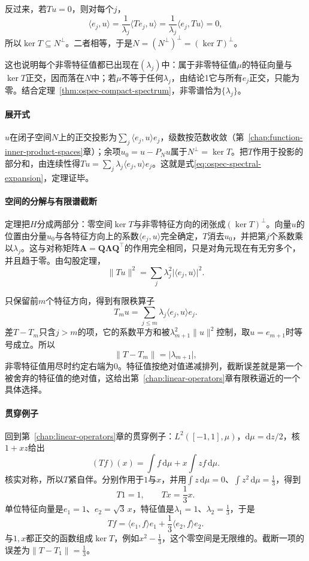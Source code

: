 反过来，若$Tu=0$，则对每个$j$，
\[
\langle e_j,u\rangle=\frac{1}{\lambda_j}\langle Te_j,u\rangle=\frac{1}{\lambda_j}\langle e_j,Tu\rangle=0 ,
\]
所以$\ker T\subseteq N^\perp$。二者相等，于是$N=(N^\perp)^\perp=(\ker T)^\perp$。

这也说明每个非零特征值都已出现在$(\lambda_j)$中：属于非零特征值$\mu$的特征向量与$\ker T$正交，因而落在$N$中；若$\mu$不等于任何$\lambda_j$，由结论1它与所有$e_j$正交，只能为零。结合定理~\ref{thm:ospec-compact-spectrum}，非零谱恰为$\{\lambda_j\}$。

\paragraph{展开式}
$u$在闭子空间$N$上的正交投影为$\sum_j\langle e_j,u\rangle e_j$，级数按范数收敛（第~\ref{chap:function-inner-product-spaces}章）；余项$u_0=u-P_Nu$属于$N^\perp=\ker T$。把$T$作用于投影的部分和，由连续性得$Tu=\sum_j\lambda_j\langle e_j,u\rangle e_j$。这就是式\eqref{eq:ospec-spectral-expansion}，定理证毕。

\paragraph{空间的分解与有限谱截断}
定理把$H$分成两部分：零空间$\ker T$与非零特征方向的闭张成$(\ker T)^\perp$。向量$u$的位置由分量$u_0$与各特征方向上的系数$\langle e_j,u\rangle$完全确定，$T$消去$u_0$，并把第$j$个系数乘以$\lambda_j$。这与对称矩阵$\bm A=\bm Q\bm\Lambda\bm Q^\top$的作用完全相同，只是对角元现在有无穷多个，并且趋于零。由勾股定理，
\begin{equation}
\lVert Tu\rVert^2=\sum_j\lambda_j^2\lvert\langle e_j,u\rangle\rvert^2 .
\label{eq:ospec-spectral-norm}
\end{equation}

只保留前$m$个特征方向，得到有限秩算子
\[
T_mu=\sum_{j\leq m}\lambda_j\langle e_j,u\rangle e_j .
\]
差$T-T_m$只含$j>m$的项，它的系数平方和被$\lambda_{m+1}^2\lVert u\rVert^2$控制，取$u=e_{m+1}$时等号成立。所以
\begin{equation}
\lVert T-T_m\rVert=\lvert\lambda_{m+1}\rvert,
\label{eq:ospec-spectral-truncation}
\end{equation}
非零特征值用尽时约定右端为$0$。特征值按绝对值递减排列，截断误差就是第一个被舍弃的特征值的绝对值，这给出第~\ref{chap:linear-operators}章有限秩逼近的一个具体选择。

\paragraph{贯穿例子}
回到第~\ref{chap:linear-operators}章的贯穿例子：$L^2([-1,1],\mu)$，$\mathrm d\mu=\mathrm dz/2$，核$1+xz$给出
\[
(Tf)(x)=\int f\,\mathrm d\mu+x\int zf\,\mathrm d\mu .
\]
核实对称，所以$T$紧自伴。分别作用于$1$与$x$，并用$\int z\,\mathrm d\mu=0$、$\int z^2\,\mathrm d\mu=\frac13$，得到
\[
T1=1,\qquad Tx=\frac13x.
\]
单位特征向量是$e_1=1$、$e_2=\sqrt3\,x$，特征值是$\lambda_1=1$、$\lambda_2=\frac13$，于是
\[
Tf=\langle e_1,f\rangle e_1+\frac13\langle e_2,f\rangle e_2 .
\]
与$1,x$都正交的函数组成$\ker T$，例如$x^2-\frac13$，这个零空间是无限维的。截断一项的误差为$\lVert T-T_1\rVert=\frac13$。

